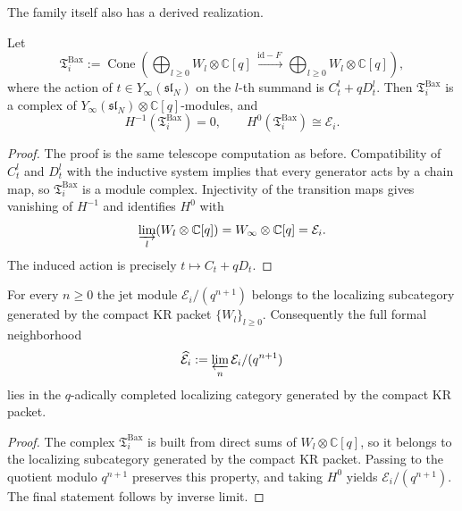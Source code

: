 The family itself also has a derived realization.

\begin{theorem}
\ClaimStatusProvedHere
\label{thm:derived-realization-baxter-rees-family}
Let
\begin{equation}
\mathfrak T_i^{\mathrm{Bax}}
:=
\operatorname{Cone}\!\left(
\bigoplus_{l\ge 0}W_l\otimes \mathbb C[q]
\xrightarrow{\ \mathrm{id}-F\ }
\bigoplus_{l\ge 0}W_l\otimes \mathbb C[q]
\right),
\end{equation}
where the action of $t\in Y_\infty(\mathfrak{sl}_N)$ on the $l$-th summand
is $C_t^l+qD_t^l$.  Then
$\mathfrak T_i^{\mathrm{Bax}}$ is a complex of
$Y_\infty(\mathfrak{sl}_N)\otimes\mathbb C[q]$-modules, and
\begin{equation}
H^{-1}(\mathfrak T_i^{\mathrm{Bax}})=0,
\qquad
H^0(\mathfrak T_i^{\mathrm{Bax}})\cong \mathcal E_i.
\end{equation}
\end{theorem}

\begin{proof}
The proof is the same telescope computation as before.  Compatibility of
$C_t^l$ and $D_t^l$ with the inductive system implies that every generator
acts by a chain map, so $\mathfrak T_i^{\mathrm{Bax}}$ is a module complex.
Injectivity of the transition maps gives vanishing of $H^{-1}$ and
identifies $H^0$ with
\begin{equation}
\varinjlim_l (W_l\otimes \mathbb C[q])=W_\infty\otimes \mathbb C[q]=\mathcal E_i.
\end{equation}
The induced action is precisely $t\mapsto C_t+qD_t$.
\end{proof}

\begin{corollary}
\ClaimStatusProvedHere
\label{cor:formal-neighborhood-generated-by-KR}
For every $n\ge 0$ the jet module $\mathcal E_i/(q^{n+1})$ belongs to the
localizing subcategory generated by the compact KR packet
$\{W_l\}_{l\ge 0}$.  Consequently the full formal neighborhood
\begin{equation}
\widehat{\mathcal E}_i:=\varprojlim_n \mathcal E_i/(q^{n+1})
\end{equation}
lies in the $q$-adically completed localizing category generated by the
compact KR packet.
\end{corollary}

\begin{proof}
The complex $\mathfrak T_i^{\mathrm{Bax}}$ is built from direct sums of
$W_l\otimes\mathbb C[q]$, so it belongs to the localizing subcategory
generated by the compact KR packet.  Passing to the quotient modulo
$q^{n+1}$ preserves this property, and taking $H^0$ yields
$\mathcal E_i/(q^{n+1})$.  The final statement follows by inverse limit.
\end{proof}

